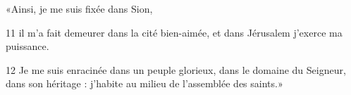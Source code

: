 «Ainsi, je me suis fixée dans Sion,

11 il m’a fait demeurer dans la cité bien-aimée, et dans Jérusalem j’exerce ma puissance.

12 Je me suis enracinée dans un peuple glorieux, dans le domaine du Seigneur, dans son héritage : j’habite au milieu de l’assemblée des saints.»
